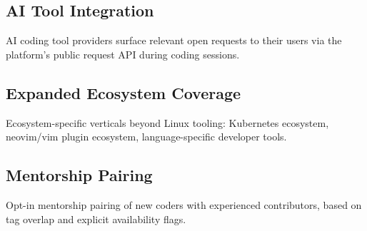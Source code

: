 \documentclass[12pt,a4paper]{article}
\begin{document}
\subsection{AI Tool Integration}
AI coding tool providers surface relevant open requests to their users via the platform's public request API during coding sessions.

\subsection{Expanded Ecosystem Coverage}
Ecosystem-specific verticals beyond Linux tooling: Kubernetes ecosystem, neovim/vim plugin ecosystem, language-specific developer tools.

\subsection{Mentorship Pairing}
Opt-in mentorship pairing of new coders with experienced contributors, based on tag overlap and explicit availability flags.

\appendix
\end{document}
